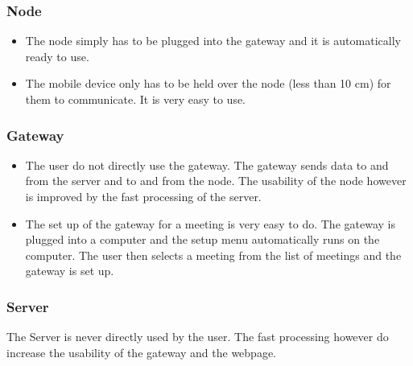\subsubsection{Node}
\begin{itemize}
\item The node simply has to be plugged into the gateway and it is automatically ready to use.
\item The mobile device only has to be held over the node (less than 10 cm) for them to communicate. It is very easy to use.%
\end{itemize}

\subsubsection{Gateway}
\begin{itemize}
\item The user do not directly use the gateway. The gateway sends data to and from the server and to and from the node. The usability of the node however is improved by the fast processing of the server.
\item The set up of the gateway for a meeting is very easy to do. The gateway is plugged into a computer and the setup menu automatically runs on the computer. The user then selects a meeting from the list of meetings and the gateway is set up. 
\end{itemize}

\subsubsection{Server}
The Server is never directly used by the user. The fast processing however do increase the usability of the gateway and the webpage.
